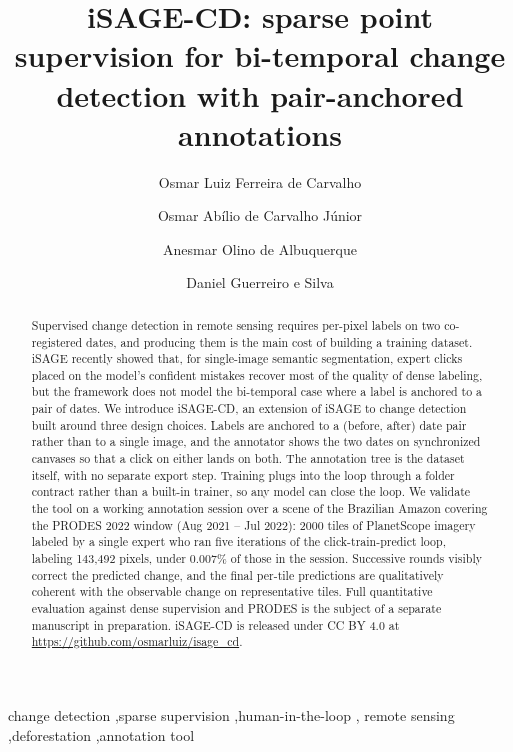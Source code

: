 \documentclass[review,3p,times]{elsarticle}
\begin{document}
\begin{frontmatter}

\title{iSAGE-CD: sparse point supervision for bi-temporal change detection
       with pair-anchored annotations}

\author[1]{Osmar Luiz Ferreira de Carvalho}
\author[2]{Osmar Ab\'ilio de Carvalho J\'unior}
\author[2]{Anesmar Olino de Albuquerque}
\author[1]{Daniel Guerreiro e Silva}

\begin{abstract}
Supervised change detection in remote sensing requires per-pixel
labels on two co-registered dates, and producing them is the main
cost of building a training dataset.
iSAGE recently showed that, for single-image semantic segmentation,
expert clicks placed on the model's confident mistakes recover most
of the quality of dense labeling, but the framework does not model
the bi-temporal case where a label is anchored to a pair of dates.
We introduce iSAGE-CD, an extension of iSAGE to change detection
built around three design choices. Labels are anchored to a
(before, after) date pair rather than to a single image, and the
annotator shows the two dates on synchronized canvases so that a
click on either lands on both. The annotation tree is the dataset
itself, with no separate export step. Training plugs into the loop
through a folder contract rather than a built-in trainer, so any
model can close the loop.
We validate the tool on a working annotation session over a scene
of the Brazilian Amazon covering the PRODES 2022 window
(Aug 2021 -- Jul 2022): 2000 tiles of PlanetScope imagery labeled
by a single expert who ran five iterations of the
click-train-predict loop, labeling 143{,}492 pixels, under
0.007\% of those in the session.
Successive rounds visibly correct the predicted change, and the
final per-tile predictions are qualitatively coherent with the
observable change on representative tiles.
Full quantitative evaluation against dense supervision and PRODES
is the subject of a separate manuscript in preparation.
iSAGE-CD is released under CC BY 4.0 at
\url{https://github.com/osmarluiz/isage_cd}.
\end{abstract}

\begin{keyword}
change detection \sep sparse supervision \sep human-in-the-loop \sep
remote sensing \sep deforestation \sep annotation tool
\end{keyword}

\end{frontmatter}
\end{document}
